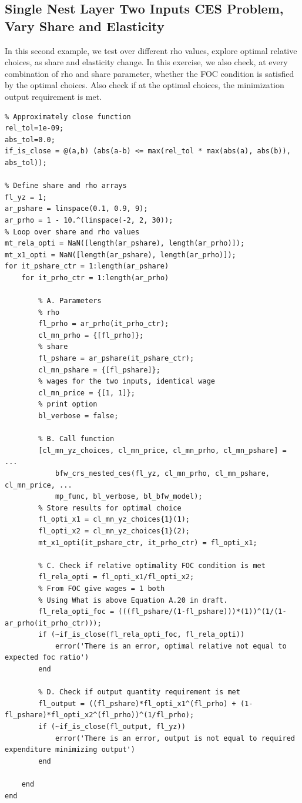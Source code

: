 \documentclass[
]{book}
\begin{document}
\hypertarget{single-nest-layer-two-inputs-ces-problem-vary-share-and-elasticity}{%
\subsection{Single Nest Layer Two Inputs CES Problem, Vary Share and Elasticity}\label{single-nest-layer-two-inputs-ces-problem-vary-share-and-elasticity}}

In this second example, we test over different rho values, explore
optimal relative choices, as share and elasticity change. In this
exercise, we also check, at every combination of rho and share
parameter, whether the FOC condition is satisfied by the optimal
choices. Also check if at the optimal choices, the minimization output
requirement is met.

\begin{verbatim}
% Approximately close function
rel_tol=1e-09;
abs_tol=0.0;
if_is_close = @(a,b) (abs(a-b) <= max(rel_tol * max(abs(a), abs(b)), abs_tol));

% Define share and rho arrays
fl_yz = 1;
ar_pshare = linspace(0.1, 0.9, 9);
ar_prho = 1 - 10.^(linspace(-2, 2, 30));
% Loop over share and rho values
mt_rela_opti = NaN([length(ar_pshare), length(ar_prho)]);
mt_x1_opti = NaN([length(ar_pshare), length(ar_prho)]);
for it_pshare_ctr = 1:length(ar_pshare)
    for it_prho_ctr = 1:length(ar_prho)

        % A. Parameters
        % rho
        fl_prho = ar_prho(it_prho_ctr);
        cl_mn_prho = {[fl_prho]};
        % share
        fl_pshare = ar_pshare(it_pshare_ctr);
        cl_mn_pshare = {[fl_pshare]};
        % wages for the two inputs, identical wage
        cl_mn_price = {[1, 1]};
        % print option
        bl_verbose = false;

        % B. Call function
        [cl_mn_yz_choices, cl_mn_price, cl_mn_prho, cl_mn_pshare] = ...
            bfw_crs_nested_ces(fl_yz, cl_mn_prho, cl_mn_pshare, cl_mn_price, ...
            mp_func, bl_verbose, bl_bfw_model);
        % Store results for optimal choice
        fl_opti_x1 = cl_mn_yz_choices{1}(1);
        fl_opti_x2 = cl_mn_yz_choices{1}(2);
        mt_x1_opti(it_pshare_ctr, it_prho_ctr) = fl_opti_x1;

        % C. Check if relative optimality FOC condition is met
        fl_rela_opti = fl_opti_x1/fl_opti_x2;
        % From FOC give wages = 1 both
        % Using What is above Equation A.20 in draft.
        fl_rela_opti_foc = (((fl_pshare/(1-fl_pshare)))*(1))^(1/(1-ar_prho(it_prho_ctr)));
        if (~if_is_close(fl_rela_opti_foc, fl_rela_opti))
            error('There is an error, optimal relative not equal to expected foc ratio')
        end

        % D. Check if output quantity requirement is met
        fl_output = ((fl_pshare)*fl_opti_x1^(fl_prho) + (1-fl_pshare)*fl_opti_x2^(fl_prho))^(1/fl_prho);
        if (~if_is_close(fl_output, fl_yz))
            error('There is an error, output is not equal to required expenditure minimizing output')
        end

    end
end
\end{verbatim}
\end{document}
